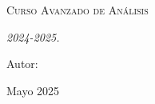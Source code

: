 \begin{titlepage}
    \centering
    \vspace{1cm}
    {\bfseries\LARGE \institution \par}
    \vspace{1cm}
    {\scshape\Large Curso Avanzado de Análisis \par}
    \vspace{3cm}
    {\scshape\Huge \projecttitle \par}
    \vspace{3cm}
    {\itshape\Large   
    2024-2025. \par}
    \vfill
    {\Large Autor: \par}
    {\Large \authorname \par}
    \vfill
    {\Large Mayo 2025 \par}
\end{titlepage}
